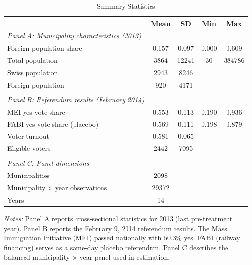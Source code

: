 \begin{table}[htbp]
\centering
\caption{Summary Statistics}
\label{tab:summary}
\begin{tabular}{lcccc}
\hline\hline
 & Mean & SD & Min & Max \\
\hline
\emph{Panel A: Municipality characteristics (2013)} & & & & \\
Foreign population share & 0.157 & 0.097 & 0.000 & 0.609 \\
Total population & 3864 & 12241 & 30 & 384786 \\
Swiss population & 2943 & 8246 &  &  \\
Foreign population & 920 & 4171 &  &  \\
 \\
\emph{Panel B: Referendum results (February 2014)} & & & & \\
MEI yes-vote share & 0.553 & 0.113 & 0.190 & 0.936 \\
FABI yes-vote share (placebo) & 0.569 & 0.111 & 0.198 & 0.879 \\
Voter turnout & 0.581 & 0.065 &  &  \\
Eligible voters & 2442 & 7095 &  &  \\
 \\
\emph{Panel C: Panel dimensions} & & & & \\
Municipalities & 2098 &  &  &  \\
Municipality $\times$ year observations & 29372 &  &  &  \\
Years & 14 &  &  &  \\
\hline\hline
\end{tabular}
\begin{tablenotes}[flushleft]\footnotesize
\item \textit{Notes:} Panel A reports cross-sectional statistics for 2013 (last pre-treatment year). Panel B reports the February 9, 2014 referendum results. The Mass Immigration Initiative (MEI) passed nationally with 50.3\% yes. FABI (railway financing) serves as a same-day placebo referendum. Panel C describes the balanced municipality $\times$ year panel used in estimation.
\end{tablenotes}
\end{table}

